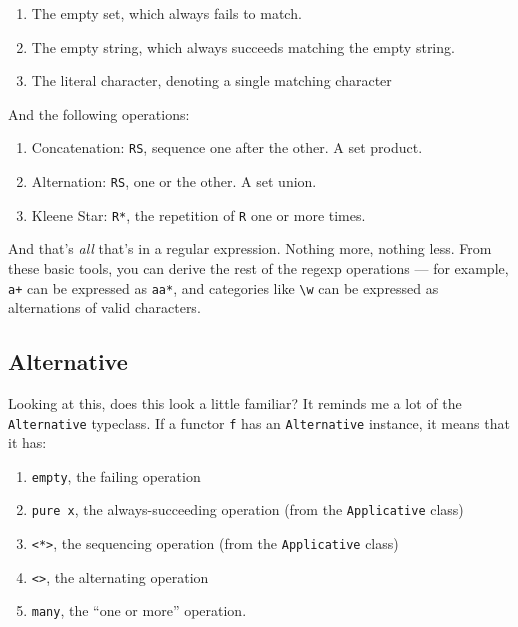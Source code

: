 \documentclass[]{article}
\begin{document}
\begin{enumerate}
\def\labelenumi{\arabic{enumi}.}
\tightlist
\item
  The empty set, which always fails to match.
\item
  The empty string, which always succeeds matching the empty string.
\item
  The literal character, denoting a single matching character
\end{enumerate}

And the following operations:

\begin{enumerate}
\def\labelenumi{\arabic{enumi}.}
\tightlist
\item
  Concatenation: \texttt{RS}, sequence one after the other. A set product.
\item
  Alternation: \texttt{R\textbar{}S}, one or the other. A set union.
\item
  Kleene Star: \texttt{R*}, the repetition of \texttt{R} one or more times.
\end{enumerate}

And that's \emph{all} that's in a regular expression. Nothing more, nothing
less. From these basic tools, you can derive the rest of the regexp operations
--- for example, \texttt{a+} can be expressed as \texttt{aa*}, and categories
like \texttt{\textbackslash{}w} can be expressed as alternations of valid
characters.

\hypertarget{alternative}{%
\subsection{Alternative}\label{alternative}}

Looking at this, does this look a little familiar? It reminds me a lot of the
\texttt{Alternative} typeclass. If a functor \texttt{f} has an
\texttt{Alternative} instance, it means that it has:

\begin{enumerate}
\def\labelenumi{\arabic{enumi}.}
\tightlist
\item
  \texttt{empty}, the failing operation
\item
  \texttt{pure\ x}, the always-succeeding operation (from the
  \texttt{Applicative} class)
\item
  \texttt{\textless{}*\textgreater{}}, the sequencing operation (from the
  \texttt{Applicative} class)
\item
  \texttt{\textless{}\textbar{}\textgreater{}}, the alternating operation
\item
  \texttt{many}, the ``one or more'' operation.
\end{enumerate}
\end{document}
